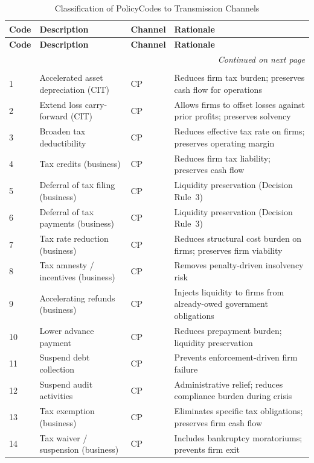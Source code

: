 \documentclass[12pt]{article}
\begin{document}
\begin{small}
\begin{longtable}{p{0.6cm} p{5.8cm} p{1.2cm} p{5.5cm}}
\caption{Classification of PolicyCodes to Transmission Channels}
\label{tab:channel_mapping} \\
\toprule
\textbf{Code} & \textbf{Description} & \textbf{Channel} & \textbf{Rationale} \\
\midrule
\endfirsthead
\toprule
\textbf{Code} & \textbf{Description} & \textbf{Channel} & \textbf{Rationale} \\
\midrule
\endhead
\midrule
\multicolumn{4}{r}{\textit{Continued on next page}} \\
\bottomrule
\endfoot
\bottomrule
\endlastfoot

\multicolumn{4}{l}{\textit{Category 1: Revenue Measures to Protect Businesses}} \\
\midrule
1  & Accelerated asset depreciation (CIT) & CP & Reduces firm tax burden; preserves cash flow for operations \\
2  & Extend loss carry-forward (CIT) & CP & Allows firms to offset losses against prior profits; preserves solvency \\
3  & Broaden tax deductibility & CP & Reduces effective tax rate on firms; preserves operating margin \\
4  & Tax credits (business) & CP & Reduces firm tax liability; preserves cash flow \\
5  & Deferral of tax filing (business) & CP & Liquidity preservation (Decision Rule~3) \\
6  & Deferral of tax payments (business) & CP & Liquidity preservation (Decision Rule~3) \\
7  & Tax rate reduction (business) & CP & Reduces structural cost burden on firms; preserves firm viability \\
8  & Tax amnesty / incentives (business) & CP & Removes penalty-driven insolvency risk \\
9  & Accelerating refunds (business) & CP & Injects liquidity to firms from already-owed government obligations \\
10 & Lower advance payment & CP & Reduces prepayment burden; liquidity preservation \\
11 & Suspend debt collection & CP & Prevents enforcement-driven firm failure \\
12 & Suspend audit activities & CP & Administrative relief; reduces compliance burden during crisis \\
13 & Tax exemption (business) & CP & Eliminates specific tax obligations; preserves firm cash flow \\
14 & Tax waiver / suspension (business) & CP & Includes bankruptcy moratoriums; prevents firm exit \\
\midrule


\end{longtable}
\end{small}
\end{document}
